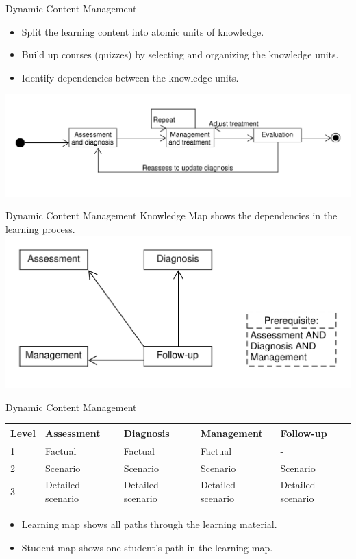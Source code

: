\documentclass{beamer}
\begin{document}
\begin{frame}{Dynamic Content Management}
\begin{itemize}
	\item Split the learning content into atomic units of knowledge.
	\item Build up courses (quizzes) by selecting and organizing the knowledge units.
	\item Identify dependencies between the knowledge units.
\end{itemize}
\includegraphics[scale=0.44]{WorkflowGraph}
\end{frame}

\begin{frame}{Dynamic Content Management}
Knowledge Map shows the dependencies in the learning process. 
\includegraphics[scale=0.5]{Knowledge}
\end{frame}

\begin{frame}{Dynamic Content Management}
\begin{table}[h!]
\begin{tabular}{|m{2em}|m{6em}|m{6em}|m{6em}|m{6em}|}
	\hline
	 Level & Assessment & Diagnosis & Management & Follow-up \\
	\hline
	1  & Factual & Factual & Factual & - \\
	2 & Scenario & Scenario & Scenario & Scenario \\
	3 & Detailed scenario  & Detailed scenario & Detailed scenario & Detailed scenario \\
	\hline
\end{tabular}
\end{table}
\begin{itemize}
	\item Learning map shows all paths through the learning material.
	\item Student map shows one student's path in the learning map.
\end{itemize}
\end{frame}
\end{document}
